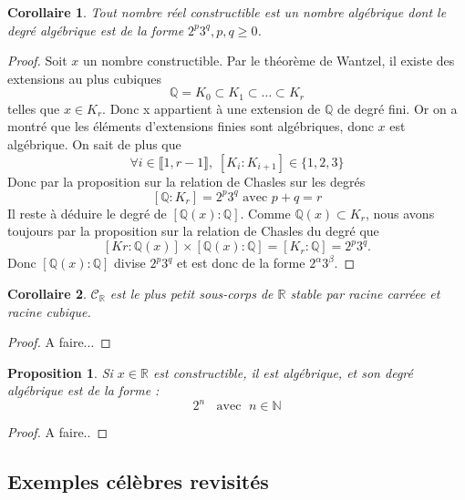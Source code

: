 \documentclass[a4paper,12pt,french]{report}
\newtheorem{proposition}{Proposition}[section]
\newtheorem{corollaire}{Corollaire}[section]
\begin{document}
		\begin{corollaire}
		     Tout nombre réel constructible est un nombre algébrique dont le degré algébrique est de la forme \( 2^{p}3^{q}, p,q\geq 0 \).
		     \end{corollaire}   
		     
		     \begin{proof}
		     Soit $x$ un nombre constructible. Par le théorème de Wantzel, il 
		     existe des extensions au plus cubiques \[ \mathbb{Q} = K_{0} 
		     \subset K_{1} \subset \dots \subset K_{r} \] telles que
		     \(x \in K_{r} \). Donc x appartient à une extension de \( 
		     \mathbb{Q} \) de degré fini. Or on a montré que les éléments d'extensions finies sont algébriques, donc $x$ est algébrique. On sait de plus que 
		     \[ 
		     \forall i \in \llbracket 1, r-1 \rrbracket, \;[K_{i}:K_{i+1}] \in \{1,2,3\} 
		     \]
		     Donc par la proposition sur 
		     la relation de Chasles sur les degrés \[
		     [\mathbb{Q}:K_{r}] 
		     = 2^{p}3^{q}\mbox{  avec }p+q =r \]
		     Il reste à déduire le degré de \( 
		     [\mathbb{Q}(x):\mathbb{Q}] \). Comme \( \mathbb{Q}(x) \subset K_{r} 
		     \), nous avons toujours par la proposition sur la relation 
		     de Chasles du degré que \[ [K{r}:\mathbb{Q}(x)]\times 
		     [\mathbb{Q}(x):\mathbb{Q}] = [K_{r}:\mathbb{Q}] = 2^{p}3^{q}. 
		     \]
		     Donc \([\mathbb{Q}(x):\mathbb{Q}] \) divise \(2^{p}3^{q}\) et est donc 
		     de la forme \(2^{\alpha}3^{\beta}\).
		     \end{proof} 
		     
		\begin{corollaire}
			 \(\mathscr{C}_{\mathbb{R}} \) est le plus petit sous-corps 
			 de \(\mathbb{R}\) stable par racine carréee et racine cubique.
		\end{corollaire}
		\begin{proof}
			A faire...
		\end{proof}
		
			\begin{proposition}
			Si $x\in\mathbb{R}$ est constructible, il est algébrique, et son degré algébrique est de la forme : 
			\[{}
				2^{n}\;\;\mbox{ avec }\;n\in\mathbb{N}
			\]
			\end{proposition}
             \begin{proof}
	             A faire..
			 \end{proof}
	
	\subsection{Exemples célèbres revisités}
	
\end{document}
